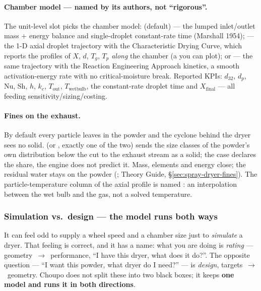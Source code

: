 \documentclass[11pt,a4paper]{article}
\begin{document}
\paragraph{Chamber model --- named by its authors, not ``rigorous''.}
The unit-level  slot picks the chamber model:
 (default) --- the lumped inlet/outlet mass + energy
balance and single-droplet constant-rate time (Marshall 1954);
 --- the 1-D axial droplet trajectory with the
Characteristic Drying Curve, which reports the profiles of $X$, $d$,
$T_g$, $T_p$ \emph{along} the chamber (a  you can
plot); or  --- the same trajectory with the Reaction
Engineering Approach kinetics, a smooth activation-energy rate with no
critical-moisture break.  Reported KPIs: $d_{32}$, $d_p$, Nu, Sh, $h$,
$k_c$, $T_{\mathrm{out}}$, $T_{\mathrm{wetbulb}}$, the constant-rate
droplet time and $X_{\mathrm{final}}$ --- all feeding
sensitivity/sizing/costing.

\paragraph{Fines on the exhaust.}  By default every particle leaves in the powder
and the cyclone behind the dryer sees no solid.   (or , exactly one of the two) sends the
size classes of the powder's own distribution below the cut to the exhaust stream as a
solid; the case declares the share, the engine does not predict it.  Mass, elements and
energy close; the residual water stays on the powder
(; Theory Guide, \S\ref{sec:spray-dryer-fines}).  The
particle-temperature column of the axial profile is named : an
interpolation between the wet bulb and the gas, not a solved temperature.

\subsubsection{Simulation vs.\ design --- the model runs both ways}\label{sec:spray-design}

It can feel odd to supply a wheel speed and a chamber size just to
\emph{simulate} a dryer.  That feeling is correct, and it has a name:
what you are doing is \emph{rating} ---
geometry~$\rightarrow$~performance, ``I have this dryer, what does it
do?''.  The opposite question --- ``I want this powder, what dryer do I
need?'' --- is \emph{design}, targets~$\rightarrow$~geometry.  Choupo
does not split these into two black boxes; it keeps \textbf{one model
and runs it in both directions}.
\end{document}
